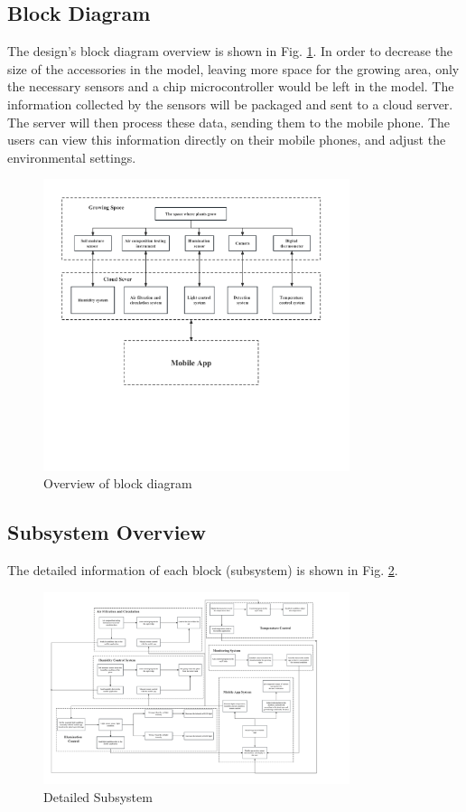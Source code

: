 \subsection{Block Diagram} 
The design's block diagram overview is shown in Fig. \ref{fig:overview_block_diagram}. In order to decrease the size of the accessories in the model, leaving more space for the growing area, only the necessary sensors and a chip microcontroller would be left in the model. The information collected by the sensors will be packaged and sent to a cloud server. The server will then process these data, sending them to the mobile phone. The users can view this information directly on their mobile phones, and adjust the environmental settings.

\begin{figure}[!htb]
\centering
\includegraphics[width=0.8\textwidth]{Figure/block_overview.pdf}
\caption{Overview of block diagram}
\label{fig:overview_block_diagram}
\end{figure}


\subsection{Subsystem Overview} 
The detailed information of each block (subsystem) is shown in Fig. \ref{fig:d_block}. 

\begin{figure}[!htb]
\centering
\includegraphics[width=0.8\textwidth]{Figure/detailed_block.pdf}
\caption{Detailed Subsystem}
\label{fig:d_block}
\end{figure}

